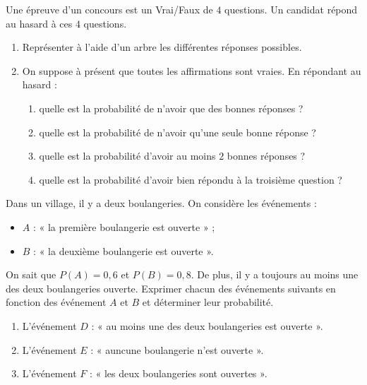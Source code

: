 \documentclass[11pt]{article}
\begin{document}
\begin{exo}
  Une épreuve d'un concours est un Vrai/Faux de $4$ questions. Un candidat
  répond au hasard à ces $4$ questions.
  \begin{enumerate}
    \item Représenter à l'aide d'un arbre les différentes réponses possibles.
    \item On suppose à présent que toutes les affirmations sont vraies. En
      répondant au hasard :
      \begin{enumerate}
        \item quelle est la probabilité de n'avoir que des bonnes réponses ?
        \item quelle est la probabilité de n'avoir qu'une seule bonne réponse ?
        \item quelle est la probabilité d'avoir au moins $2$ bonnes réponses ?
        \item quelle est la probabilité d'avoir bien répondu à la troisième
          question ?
      \end{enumerate}
  \end{enumerate}
\end{exo}

\newpage
\begin{exo}
  Dans un village, il y a deux boulangeries. On considère les événements :
  \begin{itemize}
    \item $A$ : « la première boulangerie est ouverte » ;
    \item $B$ : « la deuxième boulangerie est ouverte ».
  \end{itemize}
  On sait que $P(A) = 0,6$ et $P(B)=0,8$. De plus, il y a toujours au moins une
  des deux boulangeries ouverte. Exprimer chacun des événements suivants en
  fonction des événement $A$ et $B$ et déterminer leur probabilité.
  \begin{enumerate}
    \item L'événement $D$ : « au moins une des deux boulangeries est ouverte ».
    \item L'événement $E$ : « auncune boulangerie n'est ouverte ».
    \item L'événement $F$ : « les deux boulangeries sont ouvertes ».
  \end{enumerate}
  
\end{exo}
\end{document}

